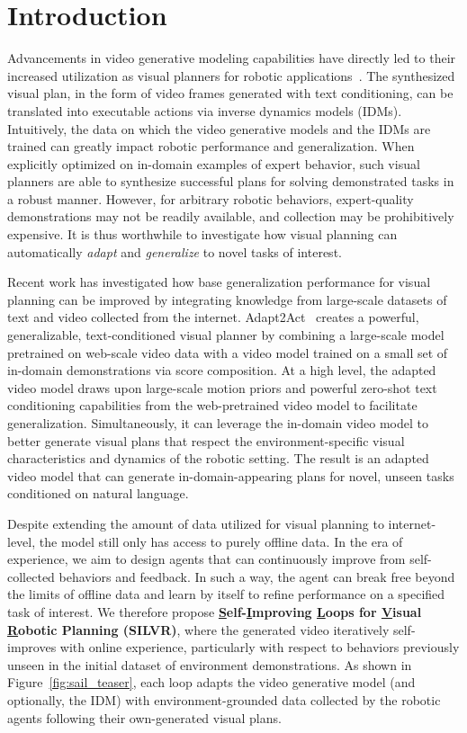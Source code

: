 \vspace{-0.75em}
\section{Introduction}
\vspace{-0.15em}
Advancements in video generative modeling capabilities have directly led to their increased utilization as visual planners for robotic applications~\citep{du2024video, yang2023learning,  ko2024avdc, liang2024dreamitate}. The synthesized visual plan, in the form of video frames generated with text conditioning, can be translated into executable actions via inverse dynamics models (IDMs). Intuitively, the data on which the video generative models and the IDMs are trained can greatly impact robotic performance and generalization.  When explicitly optimized on in-domain examples of expert behavior, such visual planners are able to synthesize successful plans for solving demonstrated tasks in a robust manner.  However, for arbitrary robotic behaviors, expert-quality demonstrations may not be readily available, and collection may be prohibitively expensive. It is thus worthwhile to investigate how visual planning can automatically \textit{adapt} and \textit{generalize} to novel tasks of interest.

Recent work has investigated how base generalization performance for visual planning can be improved by integrating knowledge from large-scale datasets of text and video collected from the internet.  Adapt2Act~\citep{luo2025solving} creates a powerful, generalizable, text-conditioned visual planner by combining a large-scale model pretrained on web-scale video data with a video model trained on a small set of in-domain demonstrations via score composition.  At a high level, the adapted video model draws upon large-scale motion priors and powerful zero-shot text conditioning capabilities from the web-pretrained video model to facilitate generalization. Simultaneously, it can leverage the in-domain video model to better generate visual plans that respect the environment-specific visual characteristics and dynamics of the robotic setting.  The result is an adapted video model that can generate in-domain-appearing plans for novel, unseen tasks conditioned on natural language.

Despite extending the amount of data utilized for visual planning to internet-level, the model still only has access to purely offline data. In the era of experience, we aim to design agents that can continuously improve from self-collected behaviors and feedback. In such a way, the agent can break free beyond the limits of offline data and learn by itself to refine performance on a specified task of interest.  We therefore propose \textbf{\underline{S}elf-\underline{I}mproving \underline{L}oops for \underline{V}isual \underline{R}obotic Planning (SILVR)}, where the generated video iteratively self-improves with online experience, particularly with respect to behaviors previously unseen in the initial dataset of environment demonstrations. As shown in Figure~\ref{fig:sail_teaser}, each loop adapts the video generative model (and optionally, the IDM) with environment-grounded data collected by the robotic agents following their own-generated visual plans.


